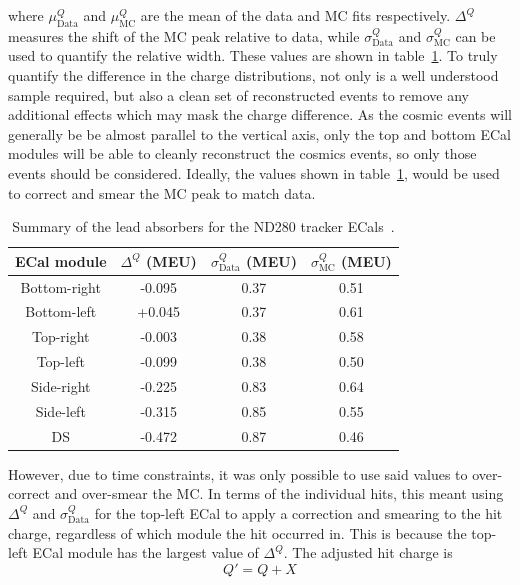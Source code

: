 where $\mu_{\textrm{Data}}^Q$ and $\mu_{\textrm{MC}}^Q$ are the mean of the data and MC fits respectively.  $\Delta^Q$ measures the shift of the MC peak relative to data, while $\sigma_{\textrm{Data}}^{Q}$ and $\sigma_{\textrm{MC}}^{Q}$ can be used to quantify the relative width.  These values are shown in table~\ref{table:HitChargeFitValues}.  To truly quantify the difference in the charge distributions, not only is a well understood sample required, but also a clean set of reconstructed events to remove any additional effects which may mask the charge difference.  As the cosmic events will generally be be almost parallel to the vertical axis, only the top and bottom ECal modules will be able to cleanly reconstruct the cosmics events, so only those events should be considered.  Ideally, the values shown in table~\ref{table:HitChargeFitValues}, would be used to correct and smear the MC peak to match data.  
\begin{table}
  \begin{tabular}{ c c c c }
   ECal module & $\Delta^{Q}$ (MEU) & $\sigma_{\textrm{Data}}^Q$ (MEU) & $\sigma_{\textrm{MC}}^Q$ (MEU) \\ \hline \hline
   Bottom-right & -0.095 & 0.37 & 0.51 \\
   Bottom-left & +0.045 & 0.37 & 0.61 \\
   Top-right & -0.003 & 0.38 & 0.58 \\
   Top-left & -0.099 & 0.38 & 0.50 \\ \hline
   Side-right & -0.225 & 0.83 & 0.64 \\
   Side-left & -0.315 & 0.85 & 0.55 \\
   DS & -0.472 & 0.87 & 0.46 \\
  \end{tabular}
  \caption{Summary of the lead absorbers for the ND280 tracker ECals~\cite{1748-0221-8-10-P10019}.}
  \label{table:HitChargeFitValues}
\end{table}
However, due to time constraints, it was only possible to use said values to over-correct and over-smear the MC.  In terms of the individual hits, this meant using $\Delta^{Q}$ and $\sigma_{\textrm{Data}}^Q$ for the top-left ECal to apply a correction and smearing to the hit charge, regardless of which module the hit occurred in.  This is because the top-left ECal module has the largest value of $\Delta^{Q}$.  The adjusted hit charge is
\begin{equation}
Q' = Q + X
\label{eqn:HitChargeCorrection}
\end{equation}
